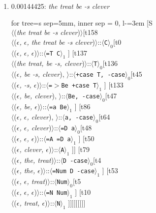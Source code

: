 \documentclass[11pt]{article}
\begin{document}
\begin{enumerate}
	\item  0.00144425: \textit{the treat be -s clever} \\[0.5em]
	\begin{adjustbox}{max width = \textwidth}
	\begin{forest}
	for tree={s sep=5mm, inner sep = 0, l-=3em}
	[S\\$\langle$(\textit{the treat be -s clever})$\rangle$[t158\\$\langle$(\textit{$\epsilon${,} $\epsilon${,} the treat be -s clever})$\rangle$::$\langle$\texttt{C}$\rangle_0$[t0\\$\langle$(\textit{$\epsilon${,} $\epsilon${,} $\epsilon$})$\rangle$::$\langle$\texttt{{=}T C}$\rangle_1$ ] [t137\\$\langle$(\textit{the treat{,} be -s{,} clever})$\rangle$::$\langle$\texttt{T}$\rangle_0$[t136\\$\langle$(\textit{$\epsilon${,} be -s{,} clever}){,} $\rangle$::$\langle$\texttt{+case T{,} -case}$\rangle_0$[t45\\$\langle$(\textit{$\epsilon${,} -s{,} $\epsilon$})$\rangle$::$\langle$\texttt{{=}$>$Be +case T}$\rangle_1$ ] [t133\\$\langle$(\textit{$\epsilon${,} be{,} clever}){,} $\rangle$::$\langle$\texttt{Be{,} -case}$\rangle_0$[t47\\$\langle$(\textit{$\epsilon${,} be{,} $\epsilon$})$\rangle$::$\langle$\texttt{{=}a Be}$\rangle_1$ ] [t86\\$\langle$(\textit{$\epsilon${,} $\epsilon${,} clever}){,} $\rangle$::$\langle$\texttt{a{,} -case}$\rangle_0$[t64\\$\langle$(\textit{$\epsilon${,} $\epsilon${,} clever})$\rangle$::$\langle$\texttt{{=}D a}$\rangle_0$[t48\\$\langle$(\textit{$\epsilon${,} $\epsilon${,} $\epsilon$})$\rangle$::$\langle$\texttt{{=}A {=}D a}$\rangle_1$ ] [t50\\$\langle$(\textit{$\epsilon${,} clever{,} $\epsilon$})$\rangle$::$\langle$\texttt{A}$\rangle_1$ ]] [t79\\$\langle$(\textit{$\epsilon${,} the{,} treat})$\rangle$::$\langle$\texttt{D -case}$\rangle_0$[t4\\$\langle$(\textit{$\epsilon${,} the{,} $\epsilon$})$\rangle$::$\langle$\texttt{{=}Num D -case}$\rangle_1$ ] [t53\\$\langle$(\textit{$\epsilon${,} $\epsilon${,} treat})$\rangle$::$\langle$\texttt{Num}$\rangle_0$[t5\\$\langle$(\textit{$\epsilon${,} $\epsilon${,} $\epsilon$})$\rangle$::$\langle$\texttt{{=}N Num}$\rangle_1$ ] [t10\\$\langle$(\textit{$\epsilon${,} treat{,} $\epsilon$})$\rangle$::$\langle$\texttt{N}$\rangle_1$ ]]]]]]]]]

\end{forest}
\end{adjustbox}
\end{enumerate}
\end{document}
